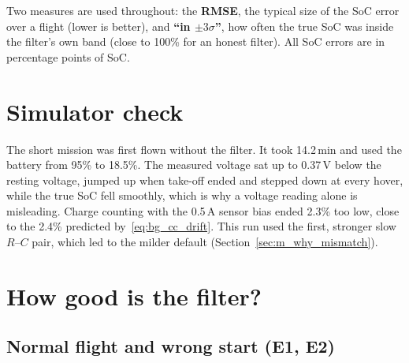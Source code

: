 
Two measures are used throughout: the \textbf{RMSE}, the typical size of the SoC error over a flight (lower is better), and \textbf{``in $\pm 3\sigma$''}, how often the true SoC was inside the filter's own band (close to 100\% for an honest filter). All SoC errors are in percentage points of SoC.

\section{Simulator check}\label{sec:r_sim}

The short mission was first flown without the filter. It took 14.2\,min and used the battery from 95\% to 18.5\%. The measured voltage sat up to 0.37\,V below the resting voltage, jumped up when take-off ended and stepped down at every hover, while the true SoC fell smoothly, which is why a voltage reading alone is misleading. Charge counting with the 0.5\,A sensor bias ended 2.3\% too low, close to the 2.4\% predicted by~\eqref{eq:bg_cc_drift}. This run used the first, stronger slow $R$--$C$ pair, which led to the milder default (Section~\ref{sec:m_why_mismatch}).


\section{How good is the filter?}\label{sec:r_estimation}

\subsection{Normal flight and wrong start (E1, E2)}\label{sec:r_e1}\label{sec:r_e2}


